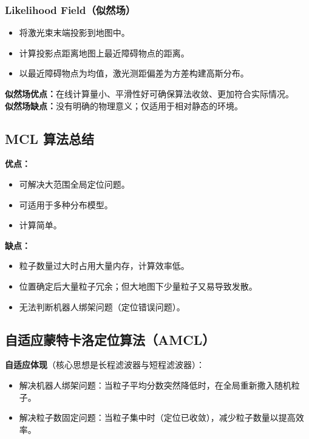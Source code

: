 \documentclass[11pt,a4paper]{article}
\begin{document}
\subsubsection*{Likelihood Field（似然场）}
\begin{itemize}
  \item 将激光束末端投影到地图中。
  \item 计算投影点距离地图上最近障碍物点的距离。
  \item 以最近障碍物点为均值，激光测距偏差为方差构建高斯分布。
\end{itemize}
\begin{notebox}
\textbf{似然场优点：}在线计算量小、平滑性好可确保算法收敛、更加符合实际情况。\\
\textbf{似然场缺点：}没有明确的物理意义；仅适用于相对静态的环境。
\end{notebox}

\subsection{MCL 算法总结}

\begin{notebox}
\textbf{优点：}
\begin{itemize}
  \item 可解决大范围全局定位问题。
  \item 可适用于多种分布模型。
  \item 计算简单。
\end{itemize}
\textbf{缺点：}
\begin{itemize}
  \item 粒子数量过大时占用大量内存，计算效率低。
  \item 位置确定后大量粒子冗余；但大地图下少量粒子又易导致发散。
  \item 无法判断机器人绑架问题（定位错误问题）。
\end{itemize}
\end{notebox}

\subsection{自适应蒙特卡洛定位算法（AMCL）}

\begin{keypoint}
\textbf{自适应体现}（核心思想是长程滤波器与短程滤波器）：
\begin{itemize}
  \item 解决机器人绑架问题：当粒子平均分数突然降低时，在全局重新撒入随机粒子。
  \item 解决粒子数固定问题：当粒子集中时（定位已收敛），减少粒子数量以提高效率。
\end{itemize}
\end{keypoint}
\end{document}
